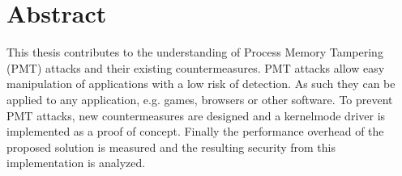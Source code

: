 \newpage
\thispagestyle{empty}
\section*{Abstract}
This thesis contributes to the understanding of Process Memory Tampering (PMT) attacks and their existing countermeasures. PMT attacks allow easy manipulation of applications with a low risk of detection. As such they can be applied to any application, e.g. games, browsers or other software. To prevent PMT attacks, new countermeasures are designed and a kernelmode driver is implemented as a proof of concept. Finally the performance overhead of the proposed solution is measured and the resulting security from this implementation is analyzed.